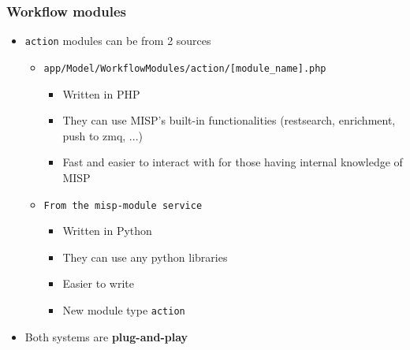 \begin{frame}
    \frametitle{Workflow modules}
    \begin{itemize}
        \item \texttt{action} modules can be from 2 sources
        \begin{itemize}
            \item \texttt{\scriptsize app/Model/WorkflowModules/action/[module\_name].php}
            \begin{itemize}
                \item Written in PHP
                \item They can use MISP's built-in functionalities (restsearch, enrichment, push to zmq, ...)
                \item Fast and easier to interact with for those having internal knowledge of MISP
            \end{itemize}
            \item \texttt{From the misp-module service} 
            \begin{itemize}
                \item Written in Python
                \item They can use any python libraries
                \item Easier to write
                \item New module type \texttt{action}
            \end{itemize}
        \end{itemize}
        \item Both systems are \textbf{plug-and-play}
    \end{itemize}
\end{frame}

